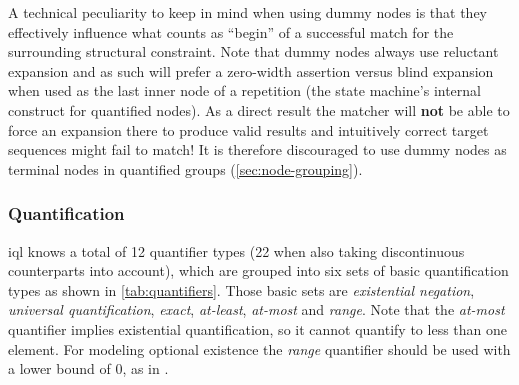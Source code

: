 \documentclass[11pt,a4paper]{report}
\begin{document}
A technical peculiarity to keep in mind when using dummy nodes is that they effectively influence what counts as ``begin'' of a successful match for the surrounding structural constraint.
Note that dummy nodes always use reluctant expansion and as such will prefer a zero-width assertion versus blind expansion when used as the last inner node of a repetition (the state machine's internal construct for quantified nodes). 
As a direct result the matcher will \textbf{not} be able to force an expansion there to produce valid results and intuitively correct target sequences might fail to match!
It is therefore discouraged to use dummy nodes as terminal nodes in quantified groups (\ref{sec:node-grouping}). 

\subsubsection{Quantification}
\label{sec:quantification}
\ac{iql} knows a total of 12 quantifier types (22 when also taking discontinuous counterparts into account), which are grouped into six sets of basic quantification types as shown in \cref{tab:quantifiers}.
Those basic sets are \textit{existential negation}, \textit{universal quantification}, \textit{exact}, \textit{at-least}, \textit{at-most} and \textit{range}.
Note that the \textit{at-most} quantifier implies existential quantification, so it cannot quantify to less than one element. 
For modeling optional existence the \textit{range} quantifier should be used with a lower bound of 0, as in .
\end{document}
